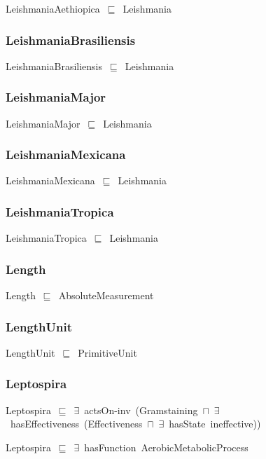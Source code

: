 \documentclass{article}
\begin{document}
LeishmaniaAethiopica~\ensuremath{\sqsubseteq}~Leishmania~

\subsubsection*{LeishmaniaBrasiliensis}

LeishmaniaBrasiliensis~\ensuremath{\sqsubseteq}~Leishmania~

\subsubsection*{LeishmaniaMajor}

LeishmaniaMajor~\ensuremath{\sqsubseteq}~Leishmania~

\subsubsection*{LeishmaniaMexicana}

LeishmaniaMexicana~\ensuremath{\sqsubseteq}~Leishmania~

\subsubsection*{LeishmaniaTropica}

LeishmaniaTropica~\ensuremath{\sqsubseteq}~Leishmania~

\subsubsection*{Length}

Length~\ensuremath{\sqsubseteq}~AbsoluteMeasurement~

\subsubsection*{LengthUnit}

LengthUnit~\ensuremath{\sqsubseteq}~PrimitiveUnit~

\subsubsection*{Leptospira}

Leptospira~\ensuremath{\sqsubseteq}~\ensuremath{\exists}~actsOn-inv~(Gramstaining~\ensuremath{\sqcap}~\ensuremath{\exists}~hasEffectiveness~(Effectiveness~\ensuremath{\sqcap}~\ensuremath{\exists}~hasState~ineffective))~

Leptospira~\ensuremath{\sqsubseteq}~\ensuremath{\exists}~hasFunction~AerobicMetabolicProcess~
\end{document}
